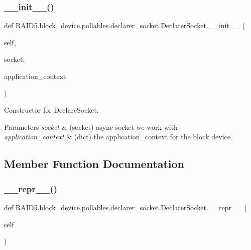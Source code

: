 \subsubsection{\texorpdfstring{\+\_\+\+\_\+init\+\_\+\+\_\+()}{\_\_init\_\_()}}
{\footnotesize\ttfamily def R\+A\+I\+D5.\+block\+\_\+device.\+pollables.\+declarer\+\_\+socket.\+Declarer\+Socket.\+\_\+\+\_\+init\+\_\+\+\_\+ (\begin{DoxyParamCaption}\item[{}]{self,  }\item[{}]{socket,  }\item[{}]{application\+\_\+context }\end{DoxyParamCaption})}



Constructor for Declare\+Socket. 


\begin{DoxyParams}{Parameters}
{\em socket} & (socket) async socket we work with \\
\hline
{\em application\+\_\+context} & (dict) the application\+\_\+context for the block device \\
\hline
\end{DoxyParams}


\subsection{Member Function Documentation}
\mbox{\label{class_r_a_i_d5_1_1block__device_1_1pollables_1_1declarer__socket_1_1_declarer_socket_a86b05b1856efb3051b78b6562934ac24}} 
\subsubsection{\texorpdfstring{\+\_\+\+\_\+repr\+\_\+\+\_\+()}{\_\_repr\_\_()}}
{\footnotesize\ttfamily def R\+A\+I\+D5.\+block\+\_\+device.\+pollables.\+declarer\+\_\+socket.\+Declarer\+Socket.\+\_\+\+\_\+repr\+\_\+\+\_\+ (\begin{DoxyParamCaption}\item[{}]{self }\end{DoxyParamCaption})}



